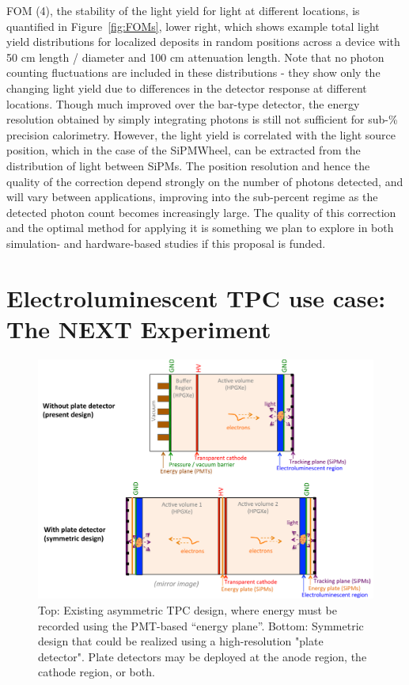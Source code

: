 FOM (4), the stability of the light yield for light at different locations, is quantified in Figure~\ref{fig:FOMs}, lower right, which shows example total light yield distributions for localized deposits in random positions across a device with 50 cm length / diameter and 100 cm attenuation length.   Note that no photon counting fluctuations are included in these distributions - they show only the changing light yield due to differences in the detector response at different locations.  Though much improved over the bar-type detector, the energy resolution obtained by simply integrating photons is still not sufficient for sub-\% precision calorimetry.  However, the light yield is correlated with the light source position, which in the case of the SiPMWheel, can be extracted from the distribution of light between SiPMs.  The position resolution and hence the quality of the correction depend strongly on the number of photons detected, and will vary between applications, improving into the sub-percent regime as the detected photon count becomes increasingly large.  The quality of this correction and the optimal method for applying it is something we plan to explore in both simulation- and hardware-based studies if this proposal is funded.




\section{Electroluminescent TPC use case: The NEXT Experiment}
\begin{figure}[t]
\begin{centering}
\includegraphics[width=0.75\columnwidth]{./images/PlateDetectorNEXT.pdf}
\par\end{centering}

\caption{Top: Existing asymmetric TPC design, where energy must be recorded using the PMT-based ``energy plane''.  Bottom: Symmetric design that could be realized using a high-resolution "plate detector".  Plate detectors may be deployed at the anode region, the cathode region, or both. \label{fig:PlateDetectorNEXT}}
\end{figure}


